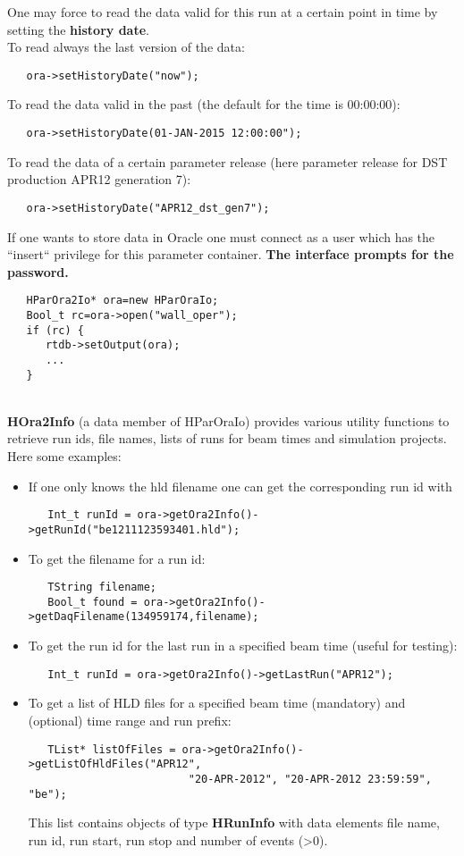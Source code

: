 One may force to read the data valid for this run at a certain point in time by setting the \textbf{history date}.\\
To read always the last version of the data:
\begin{lstlisting}
   ora->setHistoryDate("now");
\end{lstlisting}
To read the data valid in the past (the default for the time is 00:00:00):
\begin{lstlisting}
   ora->setHistoryDate(01-JAN-2015 12:00:00");
\end{lstlisting}
To read the data of a certain parameter release (here parameter release for DST production APR12 generation 7):
\begin{lstlisting}
   ora->setHistoryDate("APR12_dst_gen7");
\end{lstlisting}

If one wants to store data in Oracle one must connect as a user which has the ``insert`` privilege for this parameter container. 
\textbf{The interface prompts for the password.}
\begin{lstlisting}
   HParOra2Io* ora=new HParOraIo;
   Bool_t rc=ora->open("wall_oper");
   if (rc) {
      rtdb->setOutput(ora);
      ...
   }
\end{lstlisting}
~\\
\textbf{HOra2Info} (a data member of HParOraIo) provides various utility functions to retrieve run ids, file names, lists of runs 
for beam times and simulation projects. Here some examples:
\begin{itemize}
 \item If one only knows the hld filename one can get the corresponding run id with
   \begin{lstlisting}
   Int_t runId = ora->getOra2Info()->getRunId("be1211123593401.hld");
   \end{lstlisting}
 \item To get the filename for a run id:
   \begin{lstlisting}
   TString filename;
   Bool_t found = ora->getOra2Info()->getDaqFilename(134959174,filename);
   \end{lstlisting}
 \item To get the run id for the last run in a specified beam time (useful for testing):
   \begin{lstlisting}
   Int_t runId = ora->getOra2Info()->getLastRun("APR12");
   \end{lstlisting}
 \item To get a list of HLD files for a specified beam time (mandatory) and (optional) time range and run prefix:
   \begin{lstlisting}
   TList* listOfFiles = ora->getOra2Info()->getListOfHldFiles("APR12",
                         "20-APR-2012", "20-APR-2012 23:59:59", "be");
   \end{lstlisting}
   This list contains objects of type \textbf{HRunInfo} with data elements file name, run id, run start, run stop and 
   number of events (\textgreater 0).
\end{itemize}


